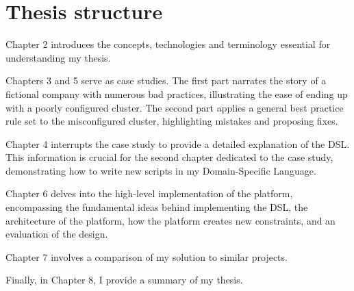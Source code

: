 \section{Thesis structure}

Chapter 2 introduces the concepts, technologies and terminology essential for understanding my thesis.

Chapters 3 and 5 serve as case studies. The first part narrates the story of a fictional company with numerous bad practices, illustrating the ease of ending up with a poorly configured cluster. The second part applies a general best practice rule set to the misconfigured cluster, highlighting mistakes and proposing fixes.

Chapter 4 interrupts the case study to provide a detailed explanation of the DSL. This information is crucial for the second chapter dedicated to the case study, demonstrating how to write new scripts in my Domain-Specific Language.

Chapter 6 delves into the high-level implementation of the platform, encompassing the fundamental ideas behind implementing the DSL, the architecture of the platform, how the platform creates new constraints, and an evaluation of the design.

Chapter 7 involves a comparison of my solution to similar projects.

Finally, in Chapter 8, I provide a summary of my thesis.
